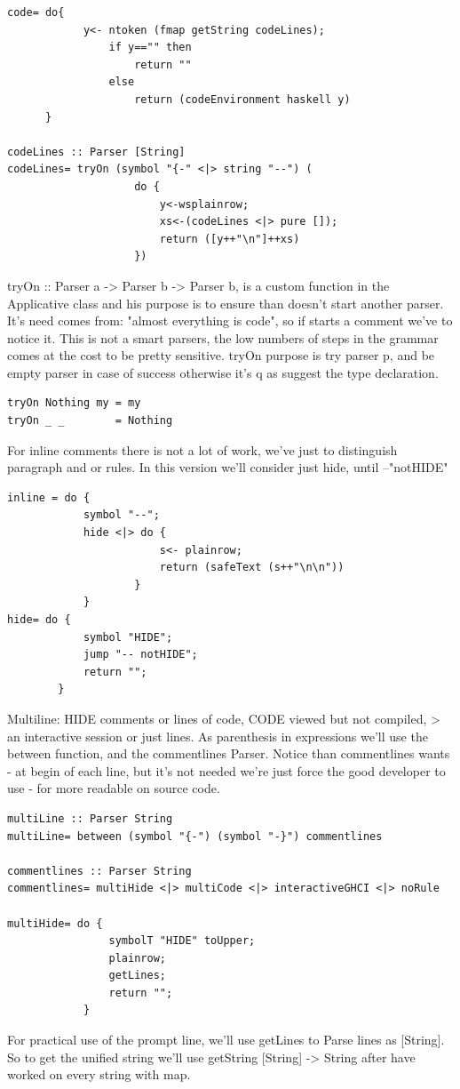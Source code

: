 \documentclass[a4papert]{article}
\begin{document}
\begin{lstlisting}[style=haskellstyle]
code= do{
            y<- ntoken (fmap getString codeLines);
                if y=="" then
                    return ""
                else
                    return (codeEnvironment haskell y)
      }

codeLines :: Parser [String]
codeLines= tryOn (symbol "{-" <|> string "--") (
                    do {
                        y<-wsplainrow;
                        xs<-(codeLines <|> pure []);
                        return ([y++"\n"]++xs)
                    })
\end{lstlisting}
tryOn :: Parser a -> Parser b -> Parser b, is a custom function in the Applicative class and his purpose is to ensure than doesn't start another parser. It's need comes from: "almost everything is code", so if starts a comment we've to notice it. This is not a smart parsers, the low numbers of steps in the grammar comes at the cost to be pretty sensitive. tryOn purpose is try parser p, and be empty parser in case of success otherwise it's q as suggest the type declaration.


\begin{lstlisting}[style=haskellstyle]
tryOn Nothing my = my
tryOn _ _        = Nothing
\end{lstlisting}


For inline comments there is not a lot of work, we've just to distinguish paragraph and or rules. In this version we'll consider just hide, until --"notHIDE"

\begin{lstlisting}[style=haskellstyle]
inline = do {
            symbol "--";
            hide <|> do {
                        s<- plainrow;
                        return (safeText (s++"\n\n"))
                    }
            }
hide= do {
            symbol "HIDE";
            jump "-- notHIDE";
            return "";
        }

\end{lstlisting}
Multiline: HIDE comments or lines of code, CODE viewed but not compiled, > an interactive session or just lines. As parenthesis in expressions we'll use the between function, and the commentlines Parser. Notice than commentlines wants - at begin of each line, but it's not needed we're just force the good developer to use - for more readable on source code.

\begin{lstlisting}[style=haskellstyle]
multiLine :: Parser String
multiLine= between (symbol "{-") (symbol "-}") commentlines

commentlines :: Parser String
commentlines= multiHide <|> multiCode <|> interactiveGHCI <|> noRule

multiHide= do {
                symbolT "HIDE" toUpper;
                plainrow;
                getLines;
                return "";
            }

\end{lstlisting}
For practical use of the prompt line, we'll use getLines to Parse lines as [String]. So to get the unified string we'll use getString [String] -> String after have worked on every string with map.
\end{document}
